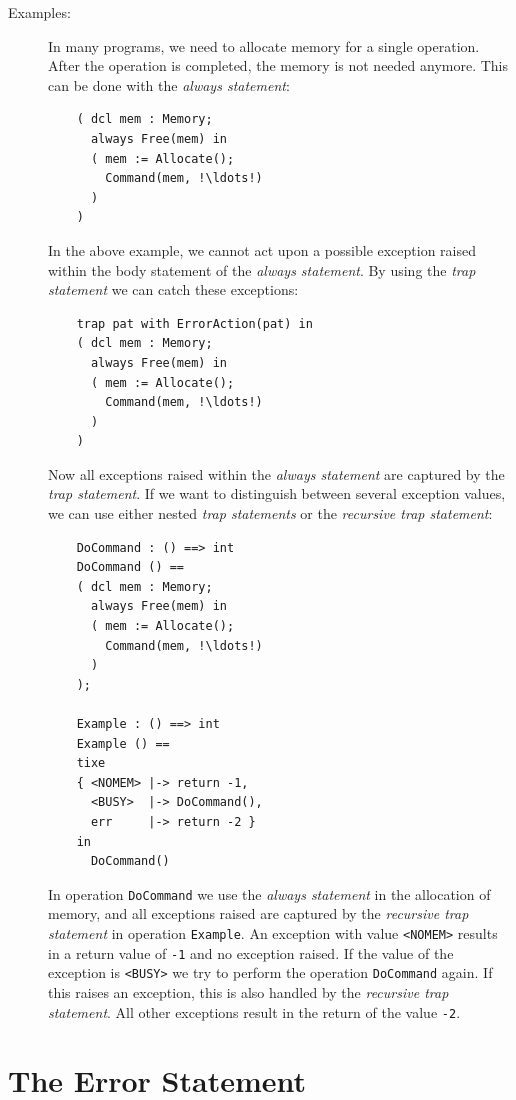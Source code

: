 \documentclass{overturerepchap}
\begin{document}
{\begin{description}
\item[Examples:] In many programs, we need to allocate memory for a
  single operation. After the operation is completed, the memory is not
  needed anymore. This can be done with the {\it always statement}:
  \begin{lstlisting}
    ( dcl mem : Memory;
      always Free(mem) in
      ( mem := Allocate();
        Command(mem, !\ldots!)
      )
    )
  \end{lstlisting}
  In the above example, we cannot act upon a possible exception raised
  within the body statement of the {\it always statement}. By using the
  {\it trap statement\/} we can catch these exceptions:
  \begin{lstlisting}
    trap pat with ErrorAction(pat) in
    ( dcl mem : Memory;
      always Free(mem) in
      ( mem := Allocate();
        Command(mem, !\ldots!)
      )
    )
  \end{lstlisting}
  Now all exceptions raised within the {\it always statement\/} are
  captured by the {\it trap statement}. If we want to distinguish between
  several exception values, we can use either nested {\it trap
    statements\/} or the {\it recursive trap statement}:
  \begin{lstlisting}
    DoCommand : () ==> int
    DoCommand () ==
    ( dcl mem : Memory;
      always Free(mem) in
      ( mem := Allocate();
        Command(mem, !\ldots!)
      )
    );

    Example : () ==> int
    Example () ==
    tixe
    { <NOMEM> |-> return -1,
      <BUSY>  |-> DoCommand(),
      err     |-> return -2 }
    in
      DoCommand()
  \end{lstlisting}
  In operation {\tt DoCommand} we use the {\it always statement\/} in the
  allocation of memory, and all exceptions raised are captured by the {\it
    recursive trap statement\/} in operation {\tt Example}. An exception
  with value {\tt <NOMEM>} results in a return value of {\tt -1} and no
  exception raised. If the value of the exception is {\tt <BUSY>} we try to
  perform the operation {\tt DoCommand} again. If this raises an exception,
  this is also handled by the {\it recursive trap statement}. All other
  exceptions result in the return of the value {\tt -2}.
\end{description}

\section{The Error Statement}

}
\end{document}

